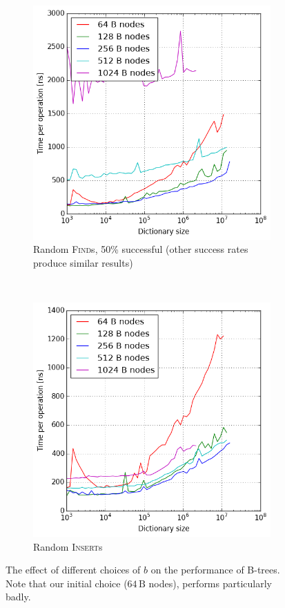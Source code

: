 \begin{figure}
\centering
\begin{subfigure}[t]{0.45\textwidth}
	\includegraphics[width=\textwidth]{img/btree-b-find-50}
	\caption{Random \textsc{Find}s, 50\% successful (other success rates
		produce similar results)}
\end{subfigure}
~
\begin{subfigure}[t]{0.45\textwidth}
	\includegraphics[width=\textwidth]{img/btree-b-insert}
	\caption{Random \textsc{Insert}s}
\end{subfigure}
\caption{The effect of different choices of $b$ on the performance of B-trees.
	Note that our initial choice ($64\,\text{B}$ nodes), performs
	particularly badly.}
\label{fig:btree-b-perf}
\end{figure}

